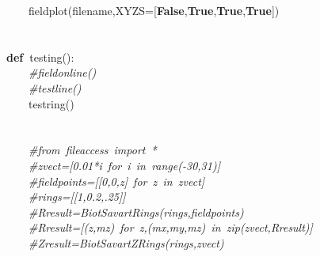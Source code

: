 \documentclass{article}
\newcommand{\hlstd}[1]{\textcolor[rgb]{0,0,0}{#1}}
\newcommand{\hlslc}[1]{\textcolor[rgb]{0.51,0.51,0.51}{\it{#1}}}
\newcommand{\hlsym}[1]{\textcolor[rgb]{0,0,0}{#1}}
\newcommand{\hlkwa}[1]{\textcolor[rgb]{0,0,0}{\bf{#1}}}
\newcommand{\hlkwd}[1]{\textcolor[rgb]{0,0,0.51}{#1}}
\begin{document}
\hlstd{}\hlstd{\ \ \ \ }\hlstd{}\hlkwd{fieldplot}\hlstd{}\hlsym{(}\hlstd{filename}\hlsym{,}\hlstd{XYZS}\hlsym{={[}}\hlstd{}\hlkwa{False}\hlstd{}\hlsym{,}\hlstd{}\hlkwa{True}\hlstd{}\hlsym{,}\hlstd{}\hlkwa{True}\hlstd{}\hlsym{,}\hlstd{}\hlkwa{True}\hlstd{}\hlsym{{]})}\hspace*{\fill}\\
\hlstd{}\hspace*{\fill}\\
\hspace*{\fill}\\
\hlkwa{def\ }\hlstd{}\hlkwd{testing}\hlstd{}\hlsym{():}\hspace*{\fill}\\
\hlstd{}\hlstd{\ \ \ \ }\hlstd{}\hlslc{\#fieldonline()}\hspace*{\fill}\\
\hlstd{}\hlstd{\ \ \ \ }\hlstd{}\hlslc{\#testline()}\hspace*{\fill}\\
\hlstd{}\hlstd{\ \ \ \ }\hlstd{}\hlkwd{testring}\hlstd{}\hlsym{()}\hspace*{\fill}\\
\hlstd{\hspace*{\fill}\\
\hspace*{\fill}\\
}\hlstd{\ \ \ \ }\hlstd{}\hlslc{\#from\ fileaccess\ import\ {*}}\hspace*{\fill}\\
\hlstd{}\hlstd{\ \ \ \ }\hlstd{}\hlslc{\#zvect={[}0.01{*}i\ for\ i\ in\ range({-}30,31){]}}\hspace*{\fill}\\
\hlstd{}\hlstd{\ \ \ \ }\hlstd{}\hlslc{\#fieldpoints={[}{[}0,0,z{]}\ for\ z\ in\ zvect{]}}\hspace*{\fill}\\
\hlstd{}\hlstd{\ \ \ \ }\hlstd{}\hlslc{\#rings={[}{[}1,0.2,.25{]}{]}}\hspace*{\fill}\\
\hlstd{}\hlstd{\ \ \ \ }\hlstd{}\hlslc{\#Rresult=Biot\textunderscore Savart\textunderscore Rings(rings,fieldpoints)}\hspace*{\fill}\\
\hlstd{}\hlstd{\ \ \ \ }\hlstd{}\hlslc{\#Rresult={[}(z,mz)\ for\ z,(mx,my,mz)\ in\ zip(zvect,Rresult){]}}\hspace*{\fill}\\
\hlstd{}\hlstd{\ \ \ \ }\hlstd{}\hlslc{\#Zresult=Biot\textunderscore Savart\textunderscore ZRings(rings,zvect)}\hspace*{\fill}\\
\end{document}
